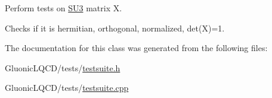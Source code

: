 Perform tests on \mbox{\hyperlink{class_s_u3}{S\+U3}} matrix X. 

Checks if it is hermitian, orthogonal, normalized, det(\+X)=1. 

The documentation for this class was generated from the following files\+:\begin{DoxyCompactItemize}
\item 
Gluonic\+L\+Q\+C\+D/tests/\mbox{\hyperlink{testsuite_8h}{testsuite.\+h}}\item 
Gluonic\+L\+Q\+C\+D/tests/\mbox{\hyperlink{testsuite_8cpp}{testsuite.\+cpp}}\end{DoxyCompactItemize}
